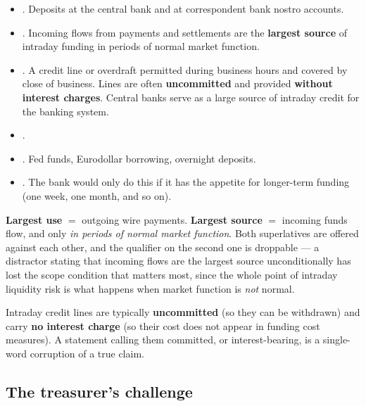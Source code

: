 \begin{itemize}
\item {}. Deposits at the central bank and at correspondent bank nostro accounts.
\item {}. Incoming flows from payments and  settlements are the \textbf{largest source} of intraday funding in periods of normal market function.
\item {}. A credit line or overdraft permitted during business hours and covered by close of business. Lines are often \textbf{uncommitted} and provided \textbf{without interest charges}. Central banks serve as a large source of intraday credit for the banking system.
\item {}.
\item {}. Fed funds, Eurodollar borrowing, overnight deposits.
\item {}. The bank would only do this if it has the appetite for longer-term funding (one week, one month, and so on).
\end{itemize}

\begin{lrtrapbox}
\textbf{Largest use} $=$ outgoing wire payments. \textbf{Largest source} $=$ incoming funds flow, and only \emph{in periods of normal market function}. Both superlatives are offered against each other, and the qualifier on the second one is droppable — a distractor stating that incoming flows are the largest source unconditionally has lost the scope condition that matters most, since the whole point of intraday liquidity risk is what happens when market function is \emph{not} normal.
\end{lrtrapbox}

\begin{lrtrapbox}
Intraday credit lines are typically \textbf{uncommitted} (so they can be withdrawn) and carry \textbf{no interest charge} (so their cost does not appear in funding cost measures). A statement calling them committed, or interest-bearing, is a single-word corruption of a true claim.
\end{lrtrapbox}

\subsection{The treasurer's challenge}

